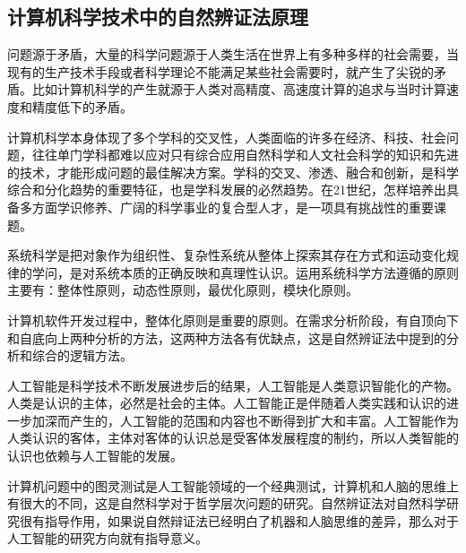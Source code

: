 \documentclass[a4paper,12pt]{report}
\begin{document}
\begin{spacing}{1.5}
	\section{计算机科学技术中的自然辨证法原理}
	问题源于矛盾，大量的科学问题源于人类生活在世界上有多种多样的社会需要，当现有的生产技术手段或者科学理论不能满足某些社会需要时，就产生了尖锐的矛盾。比如计算机科学的产生就源于人类对高精度、高速度计算的追求与当时计算速度和精度低下的矛盾。
	
	计算机科学本身体现了多个学科的交叉性，人类面临的许多在经济、科技、社会问题，往往单门学科都难以应对只有综合应用自然科学和人文社会科学的知识和先进的技术，才能形成问题的最佳解决方案。学科的交叉、渗透、融合和创新，是科学综合和分化趋势的重要特征，也是学科发展的必然趋势。在21世纪，怎样培养出具备多方面学识修养、广阔的科学事业的复合型人才，是一项具有挑战性的重要课题。
	
	系统科学是把对象作为组织性、复杂性系统从整体上探索其存在方式和运动变化规律的学问，是对系统本质的正确反映和真理性认识。运用系统科学方法遵循的原则主要有：整体性原则，动态性原则，最优化原则，模块化原则\cite{sjkfzxjs}。
	
	计算机软件开发过程中，整体化原则是重要的原则。在需求分析阶段，有自顶向下和自底向上两种分析的方法，这两种方法各有优缺点\cite{sjkfzxjs}，这是自然辨证法中提到的分析和综合的逻辑方法。
	
	人工智能是科学技术不断发展进步后的结果，人工智能是人类意识智能化的产物。人类是认识的主体，必然是社会的主体\cite{zqw2014}。人工智能正是伴随着人类实践和认识的进一步加深而产生的，人工智能的范围和内容也不断得到扩大和丰富。人工智能作为人类认识的客体，主体对客体的认识总是受客体发展程度的制约，所以人类智能的认识也依赖与人工智能的发展。
	
	计算机问题中的图灵测试是人工智能领域的一个经典测试，计算机和人脑的思维上有很大的不同，这是自然科学对于哲学层次问题的研究。自然辨证法对自然科学研究很有指导作用，如果说自然辩证法已经明白了机器和人脑思维的差异，那么对于人工智能的研究方向就有指导意义。
	
	\end{spacing}
\end{document}
